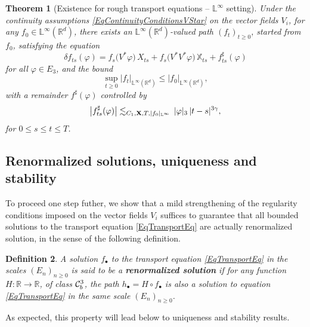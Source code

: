 \documentclass[11pt,a4paper]{amsart}
\newcommand{\RR}{\mathbb{R}}  \newcommand{\CC}{\mathbb{C}}  \newcommand{\LL}{\mathbb{L}}  \newcommand{\WW}{\mathbb{W}}
\newcommand{\bbX}{\mathbb{X}}
\renewcommand{\leq}{\leqslant}
\renewcommand{\geq}{\geqslant}
\newcommand{\ssk}{\smallskip}
\newtheorem{thm}{\hspace{-0.15cm}  {\sc Theorem} } %
\newtheorem{defn}[thm]{ \hspace{-0.3cm} {\sc Definition}}%
\numberwithin{equation}{section} %
\begin{document}
\ssk
 
\begin{thm}[Existence for rough transport equations -- $\LL^\infty$ setting]
\label{ThmExistenceTransportEquationLInfty}
Under the continuity assumptions \eqref{EqContinuityConditionsVStar} on the vector fields $V_i$, for any $f_0\in\LL^\infty(\RR^d)$, there exists an $\LL^\infty(\RR^d)$-valued path $(f_t)_{t\geq 0}$, started from $f_0$, satisfying the equation
$$
\delta f_{ts}(\varphi) = f_s\big(V^*\varphi\big)\,X_{ts} + f_s\big(V^*V^*\varphi\big)\,\bbX_{ts} + f^\sharp_{ts}(\varphi)
$$
for all $\varphi\in E_3$, and the bound
$$ 
\sup_{t\geq 0} \big| f_t\big|_{\LL^\infty(\RR^d)}\leq \big| f_0\big|_{\LL^\infty(\RR^d)},
$$ 
with a remainder $f^\sharp(\varphi)$ controlled by 
\begin{equation}
\label{EqBoundRemainder-bis}
\big|f^\sharp_{ts}(\varphi) \big| \lesssim_{C_1,{\bfX}, T, |f_0|_{\LL^\infty}} \, |\varphi|_3\,|t-s|^{3\gamma},
\end{equation}
for $0\leq s\leq t\leq T$. 
\end{thm} 
 

\bigskip


\subsection{Renormalized solutions, uniqueness and stability}
\label{SubsectionRenormalizedSolutions}

To proceed one step futher, we show that a mild strengthening of the regularity conditions imposed on the vector fields $V_i$ suffices to guarantee that all bounded solutions to the transport equation \eqref{EqTransportEq} are actually renormalized solution, in the sense of the following definition. 

\begin{defn}
\label{DefnRenormalizedSolutions}
A solution $f_\bullet$ to the transport equation \eqref{EqTransportEq} in the scales $(E_n)_{n\geq 0}$ is said to be a \emph{\bf renormalized solution} if for any function $H : \RR\rightarrow\RR$, of class $\mathcal{C}^3_b$, the path $h_\bullet = H\circ f_\bullet$ is also a solution to equation \eqref{EqTransportEq} in the same scale $(E_n)_{n\geq 0}$.
\end{defn}

As expected, this property will lead below to uniqueness and stability results.
\end{document}
